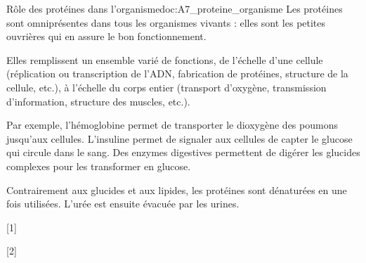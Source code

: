 \begin{doc}{Rôle des protéines dans l'organisme}{doc:A7_proteine_organisme}
  Les protéines sont omniprésentes dans tous les organismes vivants : elles sont les petites ouvrières qui en assure le bon fonctionnement.
  
  Elles remplissent un ensemble varié de fonctions, de l'échelle d'une cellule (réplication ou transcription de l'ADN, fabrication de protéines, structure de la cellule, etc.), à l'échelle du corps entier (transport d'oxygène, transmission d'information, structure des muscles, etc.).

  Par exemple, l'hémoglobine permet de transporter le dioxygène des poumons jusqu'aux cellules.
  L'insuline permet de signaler aux cellules de capter le glucose qui circule dans le sang.
  Des enzymes digestives permettent de digérer les glucides complexes pour les transformer en glucose.

  Contrairement aux glucides et aux lipides, les protéines sont dénaturées en  une fois utilisées.
  L'urée est ensuite évacuée par les urines.
\end{doc}

[1]

[2]
